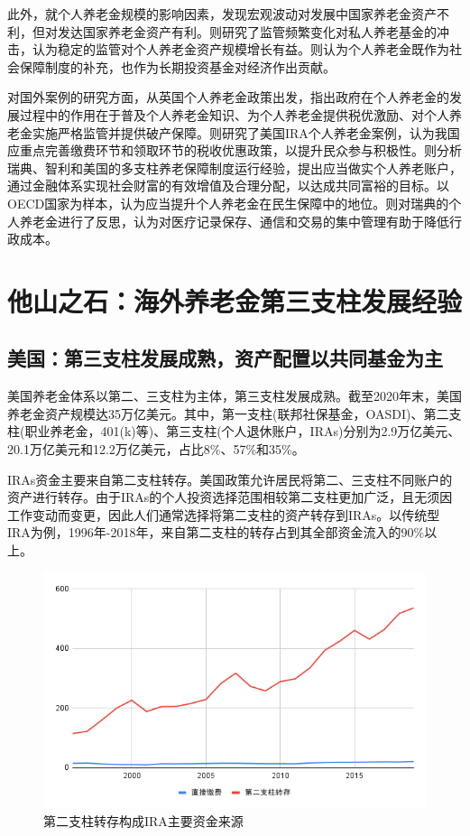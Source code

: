 \documentclass[a4paper,zihao=5]{ctexart}
\begin{document}
此外，就个人养老金规模的影响因素，\citet{2021Public}发现宏观波动对发展中国家养老金资产不利，但对发达国家养老金资产有利。\citet{2021Private}则研究了监管频繁变化对私人养老基金的冲击，认为稳定的监管对个人养老金资产规模增长有益。\citet{2019Comparative}则认为个人养老金既作为社会保障制度的补充，也作为长期投资基金对经济作出贡献。

对国外案例的研究方面，\citet{郑伟2017郑伟}从英国个人养老金政策出发，指出政府在个人养老金的发展过程中的作用在于普及个人养老金知识、为个人养老金提供税优激励、对个人养老金实施严格监管并提供破产保障。\citet{刘同洲2022促进个人养老金发展的税收政策研究}则研究了美国IRA个人养老金案例，认为我国应重点完善缴费环节和领取环节的税收优惠政策，以提升民众参与积极性。\citet{成新轩2022共同富裕目标下我国多支柱养老保障体系研究}则分析瑞典、智利和美国的多支柱养老保障制度运行经验，提出应当做实个人养老账户，通过金融体系实现社会财富的有效增值及合理分配，以达成共同富裕的目标。\citet{张盈华2022第三支柱个人养老金发展的制度要素}以OECD国家为样本，认为应当提升个人养老金在民生保障中的地位。\citet{2005Design}则对瑞典的个人养老金进行了反思，认为对医疗记录保存、通信和交易的集中管理有助于降低行政成本。

\section{他山之石：海外养老金第三支柱发展经验}
\subsection{美国：第三支柱发展成熟，资产配置以共同基金为主}
美国养老金体系以第二、三支柱为主体，第三支柱发展成熟。截至2020年末，美国养老金资产规模达35万亿美元。其中，第一支柱(联邦社保基金，OASDI)、第二支柱(职业养老金，401(k)等)、第三支柱(个人退休账户，IRAs)分别为2.9万亿美元、20.1万亿美元和12.2万亿美元，占比8\%、57\%和35\%。

IRAs资金主要来自第二支柱转存。美国政策允许居民将第二、三支柱不同账户的资产进行转存。由于IRAs的个人投资选择范围相较第二支柱更加广泛，且无须因工作变动而变更，因此人们通常选择将第二支柱的资产转存到IRAs。以传统型IRA为例，1996年-2018年，来自第二支柱的转存占到其全部资金流入的90\%以上。
\begin{figure}[H]
    \centering
    \includegraphics[width=0.8\linewidth]{img/第二支柱转存构成传统型IRA主要资金来源.png}
    \caption{第二支柱转存构成IRA主要资金来源}
\end{figure}
\end{document}
